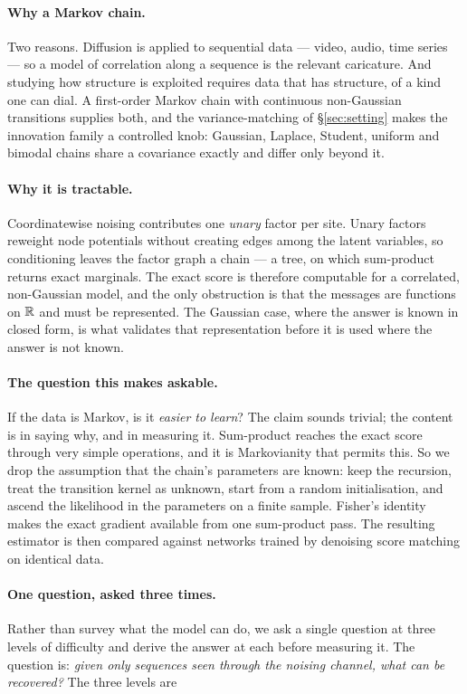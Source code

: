 \documentclass{article}
\begin{document}
\paragraph{Why a Markov chain.} Two reasons. Diffusion is applied to sequential data --- video,
audio, time series --- so a model of correlation along a sequence is the relevant caricature. And
studying how structure is exploited requires data that has structure, of a kind one can dial. A
first-order Markov chain with continuous non-Gaussian transitions supplies both, and the
variance-matching of \S\ref{sec:setting} makes the innovation family a controlled knob: Gaussian,
Laplace, Student, uniform and bimodal chains share a covariance exactly and differ only beyond it.

\paragraph{Why it is tractable.} Coordinatewise noising contributes one \emph{unary} factor per
site. Unary factors reweight node potentials without creating edges among the latent variables, so
conditioning leaves the factor graph a chain --- a tree, on which sum-product returns exact
marginals. The exact score is therefore computable for a correlated, non-Gaussian model, and the
only obstruction is that the messages are functions on $\mathbb{R}$ and must be represented. The
Gaussian case, where the answer is known in closed form, is what validates that representation
before it is used where the answer is not known.

\paragraph{The question this makes askable.} If the data is Markov, is it \emph{easier to learn}?
The claim sounds trivial; the content is in saying why, and in measuring it. Sum-product reaches
the exact score through very simple operations, and it is Markovianity that permits this. So we
drop the assumption that the chain's parameters are known: keep the recursion, treat the
transition kernel as unknown, start from a random initialisation, and ascend the likelihood in the
parameters on a finite sample. Fisher's identity makes the exact gradient available from one
sum-product pass. The resulting estimator is then compared against networks trained by denoising
score matching on identical data.

\paragraph{One question, asked three times.} Rather than survey what the model can do, we ask a
single question at three levels of difficulty and derive the answer at each before measuring it.
The question is: \emph{given only sequences seen through the noising channel, what can be
recovered?} The three levels are
\end{document}
